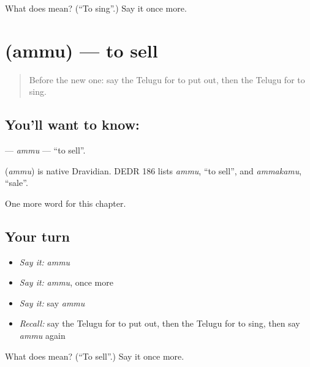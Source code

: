 \begin{tcolorbox}[breakable,colback=teal!4,colframe=teal!35!black,title={Before you move on}]
What does  mean? (\textquotedblleft{}To sing\textquotedblright{}.) Say it once more.
\end{tcolorbox}
\section[\texorpdfstring{\te{అమ్ము} (ammu)}{అమ్ము (ammu)}]{ (ammu) — to sell}

\label{lesson:TE-C148-ammu}



\begin{quote}
Before the new one: say the Telugu for to put out, then the Telugu for to sing.
\end{quote}

\subsection*{You'll want to know: }
\textbf{} — \emph{ammu} — \textquotedblleft{}to sell\textquotedblright{}.

\begin{cousinweb}
\textbf{} (\emph{ammu}) is native Dravidian. DEDR 186 lists \emph{ammu}, \textquotedblleft{}to sell\textquotedblright{}, and \emph{ammakamu}, \textquotedblleft{}sale\textquotedblright{}.
\end{cousinweb}

\begin{grammarlens}[title={What you've built}]
One more word for this chapter.
\end{grammarlens}

\subsection*{Your turn}
\begin{itemize}
\raggedright
  \item \emph{Say it:} \emph{ammu}
  \item \emph{Say it:} \emph{ammu}, once more
  \item \emph{Say it:} say \emph{ammu}
  \item \emph{Recall:} say the Telugu for to put out, then the Telugu for to sing, then say \emph{ammu} again
\end{itemize}

\begin{tcolorbox}[breakable,colback=teal!4,colframe=teal!35!black,title={Before you move on}]
What does  mean? (\textquotedblleft{}To sell\textquotedblright{}.) Say it once more.
\end{tcolorbox}
